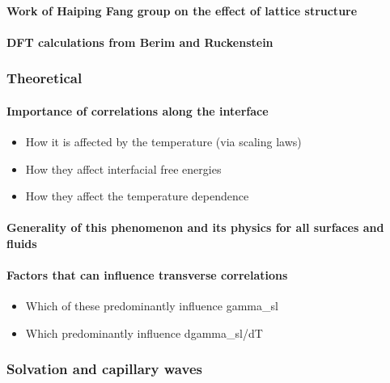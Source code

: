 \documentclass[a4paper,12pt,single,pdftex]{scrartcl}
\begin{document}
\label{ID_1854553780}\paragraph{Work of Haiping Fang group on the effect of lattice structure}

\label{ID_314119525}\paragraph{DFT calculations from Berim and Ruckenstein}

\label{ID_1942058277}\subsubsection{Theoretical}

\label{ID_1905060815}\paragraph{Importance of correlations along the interface}

\begin{itemize}
\label{ID_801342251}\item How it is affected by the temperature (via scaling laws)
\label{ID_1964284085}\item How they affect interfacial free energies
\label{ID_751345006}\item How they affect the temperature dependence
\end{itemize}
\label{ID_801342251}\label{ID_1964284085}\label{ID_751345006}\label{ID_1590536878}\paragraph{Generality of this phenomenon and its physics for all surfaces and fluids}

\label{ID_398274930}\paragraph{Factors that can influence transverse correlations}

\begin{itemize}
\label{ID_580082896}\item Which of these predominantly influence gamma_sl
\label{ID_874559696}\item Which predominantly influence dgamma_sl/dT
\end{itemize}
\label{ID_580082896}\label{ID_874559696}\label{ID_19652608}\subsubsection{Solvation and capillary waves}
\end{document}
